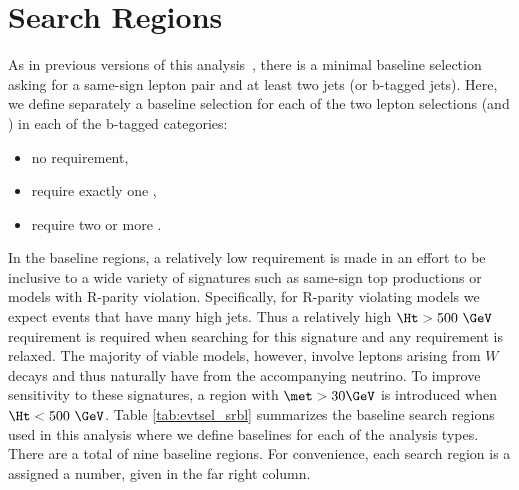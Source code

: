 \section{Search Regions}
\label{sec:evtsel_sr}
As in previous versions of this analysis~\cite{an_ssb2011,an_ssb2012,an_ssb2012hcp},
there is a minimal baseline selection asking for a same-sign lepton pair and
at least two jets (or b-tagged jets). Here, we define separately a baseline
selection for each of the two lepton selections (\hpt and \lpt) in each of the
b-tagged categories:
\begin{itemize}
\item no \bj requirement,
\item require exactly one \bj,
\item require two or more \bjs.
\end{itemize}
In the baseline regions, a relatively low \met requirement is made in an
effort to be inclusive to a wide variety of signatures such as same-sign top
productions or models with R-parity violation. Specifically, for R-parity
violating models we expect events that have many high \pt jets. Thus a
relatively high $\Ht>500\ \GeV$ requirement is required when searching for this
signature and any \met requirement is relaxed. The majority of viable models,
however, involve leptons arising from $W$ decays and thus naturally have \met
from the accompanying neutrino. To improve sensitivity to these signatures,
a region with $\met > 30 \GeV$ is introduced when $\Ht<500\ \GeV$. Table
\ref{tab:evtsel_srbl} summarizes the baseline search regions used in this
analysis where we define baselines for each of the analysis types. There are
a total of nine baseline regions. For convenience, each search region is a
assigned a number, given in the far right column.

